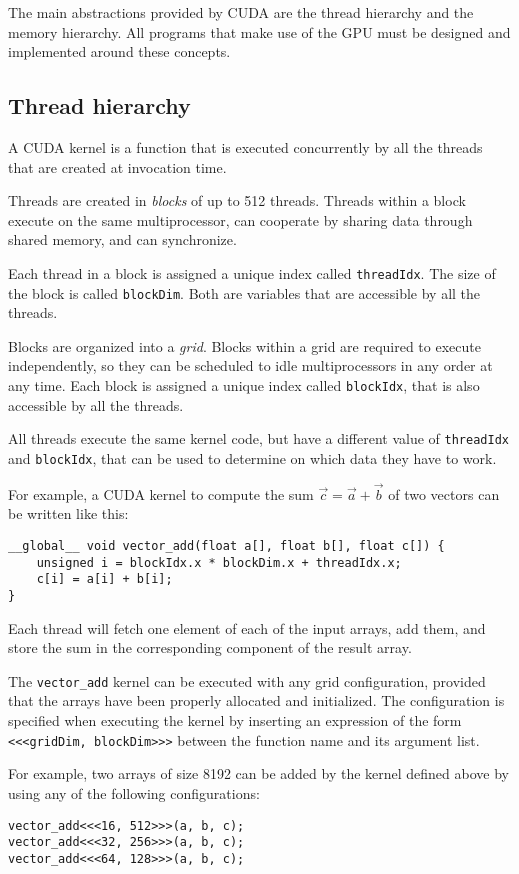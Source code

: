 The main abstractions provided by CUDA
are the thread hierarchy and the memory hierarchy.
All programs that make use of the GPU
must be designed and implemented around these concepts.

\subsection{Thread hierarchy}
\label{sub:thread-hierarchy}

A CUDA kernel is a function
that is executed concurrently
by all the threads that are created
at invocation time.

Threads are created in \emph{blocks}
of up to 512 threads.
Threads within a block
execute on the same multiprocessor,
can cooperate by sharing data through shared memory,
and can synchronize.

Each thread in a block
is assigned a unique index
called \texttt{threadIdx}.
The size of the block
is called \texttt{blockDim}.
Both are variables that are accessible
by all the threads.

Blocks are organized into a \emph{grid}.
Blocks within a grid
are required to execute independently,
so they can be scheduled to idle multiprocessors
in any order at any time.
Each block is assigned a unique index
called \verb+blockIdx+,
that is also accessible by all the threads.

All threads execute the same kernel code,
but have a different value of \verb+threadIdx+ and \verb+blockIdx+,
that can be used to determine on which data they have to work.

For example,
a CUDA kernel to compute the sum \(\vec c = \vec a + \vec b\) of two vectors
can be written like this:
\begin{verbatim}
__global__ void vector_add(float a[], float b[], float c[]) {
    unsigned i = blockIdx.x * blockDim.x + threadIdx.x;
    c[i] = a[i] + b[i];
}
\end{verbatim}
Each thread will fetch one element of each of the input arrays, add them,
and store the sum in the corresponding component of the result array.

The \verb+vector_add+ kernel can be executed with any grid configuration,
provided that the arrays have been properly allocated and initialized.
The configuration is specified when executing the kernel
by inserting an expression of the form \texttt{<<<gridDim, blockDim>>>}
between the function name and its argument list.

For example,
two arrays of size 8192 can be added
by the kernel defined above
by using any of the following configurations:
\begin{verbatim}
vector_add<<<16, 512>>>(a, b, c);
vector_add<<<32, 256>>>(a, b, c);
vector_add<<<64, 128>>>(a, b, c);
\end{verbatim}

